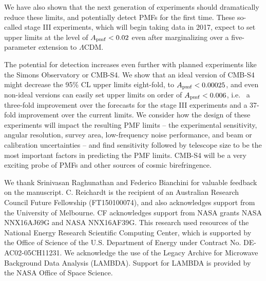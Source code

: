 \documentclass[apj]{emulateapj}
\newcommand{\apmf}{\ensuremath{A_{\rm pmf}}}
\newcommand{\lcdm}{\ensuremath{\Lambda}CDM}
\begin{document}
We have also shown that the next generation of experiments should dramatically reduce these limits, and potentially detect PMFs for the first time. 
These so-called stage III experiments, which will begin taking data in 2017, expect to set upper limits at the level of $\apmf < 0.02$ even after marginalizing over a five-parameter extension to \lcdm.

The potential for detection increases even further with planned experiments like the Simons Observatory or CMB-S4. 
We show that an ideal version of CMB-S4 might decrease the 95\% CL upper limits eight-fold, to $\apmf < 0.00025$, and even non-ideal versions can easily set upper limits on order of $\apmf < 0.006$, i.e.~ a three-fold improvement over the forecasts for the stage III experiments and a 37-fold improvement over the current limits. 
We consider how the design of these experiments will impact the resulting PMF limits -- the experimental sensitivity, angular resolution, survey area, low-frequency noise performance, and beam or calibration uncertainties -- and find sensitivity followed by telescope size to be the most important factors in predicting the PMF limits. 
CMB-S4 will be a very exciting probe of PMFs and other sources of cosmic birefringence. 

\acknowledgments

We thank Srinivasan Raghunathan and Federico Bianchini for valuable feedback on the manuscript. 
C. Reichardt is the recipient of an Australian Research Council Future Fellowship (FT150100074), and also acknowledges support from the University of Melbourne. 
CF acknowledges support from NASA grants NASA NNX16AJ69G and NASA NNX16AF39G. 
This research used resources of the National Energy Research Scientific Computing Center, which is supported by the Office of Science of the U.S. Department of Energy under Contract No. DE-AC02-05CH11231. 
We acknowledge the use of the Legacy Archive for Microwave Background Data Analysis (LAMBDA). Support for LAMBDA is provided by the NASA Office of Space Science.



\end{document}
